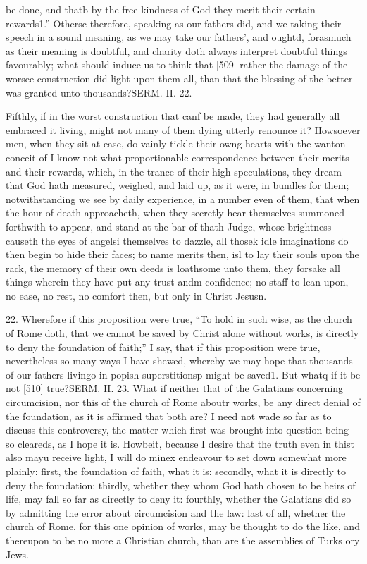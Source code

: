 be done, and thatb by the free kindness of God they merit their certain rewards1.” Othersc therefore, speaking as our fathers did, and we taking their speech in a sound meaning, as we may take our fathers’, and oughtd, forasmuch as their meaning is doubtful, and charity doth always interpret doubtful things favourably; what should induce us to think that [509] rather the damage of the worsee construction did light upon them all, than that the blessing of the better was granted unto thousands?SERM. II. 22.

Fifthly, if in the worst construction that canf be made, they had generally all embraced it living, might not many of them dying utterly renounce it? Howsoever men, when they sit at ease, do vainly tickle their owng hearts with the wanton conceit of I know not what proportionable correspondence between their merits and their rewards, which, in the trance of their high speculations, they dream that God hath measured, weighed, and laid up, as it were, in bundles for them; notwithstanding we see by daily experience, in a number even of them, that when the hour of death approacheth, when they secretly hear themselves summoned forthwith to appear, and stand at the bar of thath Judge, whose brightness causeth the eyes of angelsi themselves to dazzle, all thosek idle imaginations do then begin to hide their faces; to name merits then, isl to lay their souls upon the rack, the memory of their own deeds is loathsome unto them, they forsake all things wherein they have put any trust andm confidence; no staff to lean upon, no ease, no rest, no comfort then, but only in Christ Jesusn.

22. Wherefore if this proposition were true, “To hold in such wise, as the church of Rome doth, that we cannot be saved by Christ alone without works, is directly to deny the foundation of faith;” I say, that if this proposition were true, nevertheless so many ways I have shewed, whereby we may hope that thousands of our fathers livingo in popish superstitionsp might be saved1. But whatq if it be not [510] true?SERM. II. 23. What if neither that of the Galatians concerning circumcision, nor this of the church of Rome aboutr works, be any direct denial of the foundation, as it is affirmed that both are? I need not wade so far as to discuss this controversy, the matter which first was brought into question being so cleareds, as I hope it is. Howbeit, because I desire that the truth even in thist also mayu receive light, I will do minex endeavour to set down somewhat more plainly: first, the foundation of faith, what it is: secondly, what it is directly to deny the foundation: thirdly, whether they whom God hath chosen to be heirs of life, may fall so far as directly to deny it: fourthly, whether the Galatians did so by admitting the error about circumcision and the law: last of all, whether the church of Rome, for this one opinion of works, may be thought to do the like, and thereupon to be no more a Christian church, than are the assemblies of Turks ory Jews.

